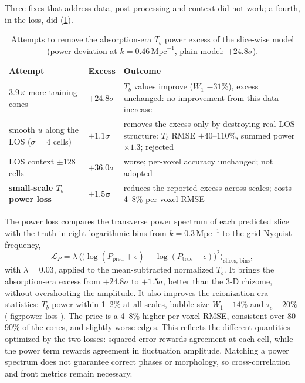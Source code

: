 Three fixes that address data, post-processing and context did not work; a fourth, in the loss, did (\cref{tab:absorption-fixes}).

\begin{table}[!htbp]
  \centering
  \caption{Attempts to remove the absorption-era $T_b$ power excess of the slice-wise model (power deviation at $k=0.46\,\mathrm{Mpc}^{-1}$, plain model: $+24.8\sigma$).}
  \label{tab:absorption-fixes}
  \footnotesize
  \begin{tabular}{@{}p{2.2cm}p{1.05cm}p{4.3cm}@{}}
    \toprule
    Attempt & Excess & Outcome \\
    \midrule
    3.9$\times$ more training cones & $+24.8\sigma$ & $T_b$ values improve ($W_1$ $-31\%$), excess unchanged: no improvement from this data increase \\
    smooth $u$ along the LOS ($\sigma=4$ cells) & $+1.1\sigma$ & removes the excess only by destroying real LOS structure: $T_b$ RMSE $+40$--$110\%$, summed power $\times1.3$; rejected \\
    LOS context $\pm128$ cells & $+36.0\sigma$ & worse; per-voxel accuracy unchanged; not adopted \\
    \textbf{small-scale $T_b$ power loss} & $\bm{+1.5\sigma}$ & reduces the reported excess across scales; costs 4--8\% per-voxel RMSE \\
    \bottomrule
  \end{tabular}
\end{table}

The power loss compares the transverse power spectrum of each predicted slice with the truth in eight logarithmic bins from $k=0.3\,\mathrm{Mpc}^{-1}$ to the grid Nyquist frequency,
\begin{equation}
  \label{eq:power-loss}
  \mathcal{L}_{P} = \lambda\,\Big\langle \big(\log(P_{\mathrm{pred}}+\epsilon)-\log(P_{\mathrm{true}}+\epsilon)\big)^2 \Big\rangle_{\text{slices, bins}},
\end{equation}
with $\lambda=0.03$, applied to the mean-subtracted normalized $T_b$. It brings the absorption-era excess from $+24.8\sigma$ to $+1.5\sigma$, better than the 3-D rhizome, without overshooting the amplitude. It also improves the reionization-era statistics: $T_b$ power within 1--2\% at all scales, bubble-size $W_1$ $-14\%$ and $\tau_e$ $-20\%$ (\cref{fig:power-loss}). The price is a 4--8\% higher per-voxel RMSE, consistent over 80--90\% of the cones, and slightly worse edges. This reflects the different quantities optimized by the two losses: squared error rewards agreement at each cell, while the power term rewards agreement in fluctuation amplitude. Matching a power spectrum does not guarantee correct phases or morphology, so cross-correlation and front metrics remain necessary.

